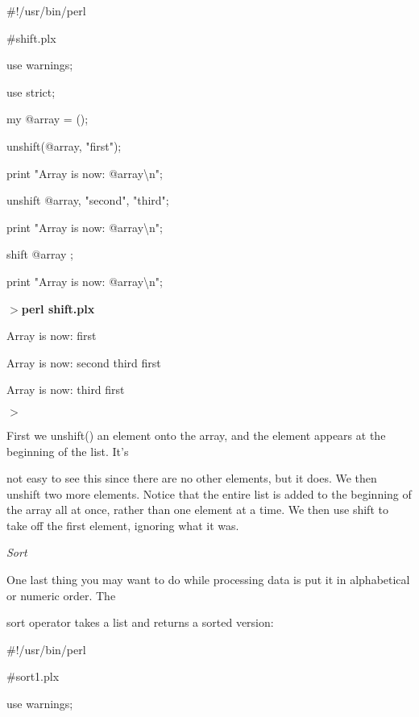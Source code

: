 \documentclass[a4paper,11pt]{book}
\begin{document}
\noindent 

\noindent \#!/usr/bin/perl

\noindent \#shift.plx

\noindent use warnings;

\noindent use strict;

\noindent 

\noindent my @array = ();

\noindent unshift(@array, "first");

\noindent print "Array is now: @array\textbackslash n";

\noindent unshift @array, "second", "third";

\noindent print "Array is now: @array\textbackslash n";

\noindent shift @array ;

\noindent print "Array is now: @array\textbackslash n";

\noindent 

\noindent $>$\textbf{perl shift.plx}

\noindent Array is now: first

\noindent Array is now: second third first

\noindent Array is now: third first

\noindent $>$

\noindent 

\noindent 

\noindent First we unshift() an element onto the array, and the element appears at the beginning of the list. It's

\noindent not easy to see this since there are no other elements, but it does. We then unshift two more elements. Notice that the entire list is added to the beginning of the array all at once, rather than one element at a time. We then use shift to take off the first element, ignoring what it was.

\noindent 

\noindent \textit{Sort}

\noindent One last thing you may want to do while processing data is put it in alphabetical or numeric order. The

\noindent sort operator takes a list and returns a sorted version:

\noindent 

\noindent 

\noindent \#!/usr/bin/perl

\noindent \#sort1.plx

\noindent use warnings;
\end{document}
